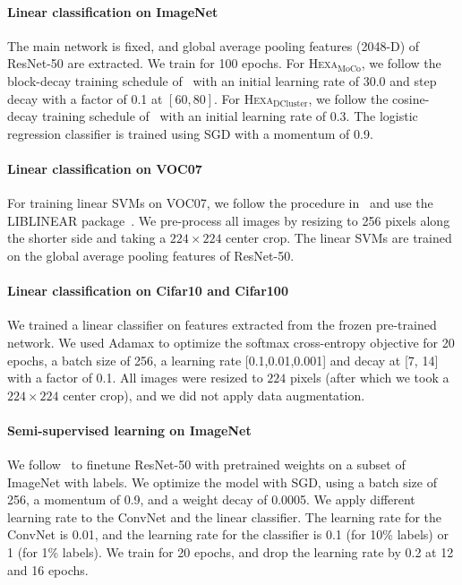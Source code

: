 \documentclass[10pt,twocolumn,letterpaper]{article}
\newcommand{\shortname}{\textsc{Hexa}}
\begin{document}
\paragraph{Linear classification on ImageNet}
The main network is fixed, and global average pooling features (2048-D) of ResNet-50 are extracted. We train for 100 epochs. For \shortname{}$_{\text{MoCo}}$, we follow the block-decay training schedule of~\cite{he2020momentum,chen2020improved} with an initial
learning rate of 30.0 and step decay with a factor of 0.1 at $[60, 80]$.
For  \shortname{}$_{\text{DCluster}}$, we follow the cosine-decay training schedule of~\cite{caron2020unsupervised} with an initial learning rate of 0.3. The logistic regression classifier is trained using SGD with a momentum of 0.9. 



\paragraph{Linear classification  on VOC07}
For training linear SVMs on VOC07, we follow the procedure in~\cite{goyal2019scaling,li2020prototypical} and use the LIBLINEAR package~\cite{fan2008liblinear}. We pre-process all images by resizing to 256 pixels along the shorter side and taking a $224 \times 224$ center crop. The linear SVMs are trained on the global average pooling features of ResNet-50.


\paragraph{Linear classification on Cifar10 and Cifar100}
We trained a linear classifier on features extracted from the frozen pre-trained network. We used Adamax to optimize the softmax cross-entropy objective for 20 epochs, a batch size of 256, a learning rate [0.1,0.01,0.001] and decay at [7, 14] with a factor of 0.1. All images were resized to $224$ pixels (after which we took a $224 \times 224$ center crop), and we did not apply data augmentation. 




\paragraph{Semi-supervised learning on ImageNet} We follow~\cite{caron2020unsupervised} to finetune ResNet-50 with pretrained weights on a subset of ImageNet with labels. We optimize the model with SGD, using a batch size of 256, a momentum of 0.9, and a weight decay of 0.0005. We apply different learning rate to the ConvNet and the linear classifier. The learning rate for the ConvNet is 0.01, and the learning rate for the classifier is 0.1 (for 10\% labels) or 1 (for 1\% labels). We train for 20 epochs, and drop the learning rate by 0.2 at 12 and 16 epochs.
\end{document}
